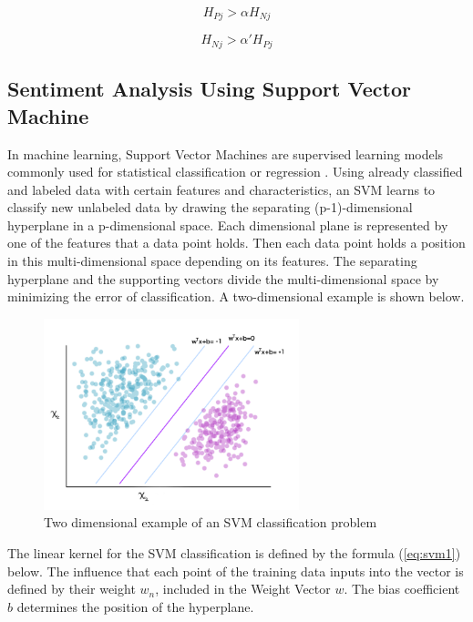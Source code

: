 \documentclass[review]{elsarticle}
\begin{document}
\begin{equation}\label{eq:entropy_pos}
H_{Pj} > \alpha H_{Nj}
\end{equation}

\begin{equation}\label{eq:entropy_neg}
H_{Nj} > \alpha' H_{Pj}
\end{equation}

\subsection{Sentiment Analysis Using Support Vector Machine}\label{svm}

In machine learning, Support Vector Machines are supervised learning models commonly used for statistical classification or regression \cite[][]{cortes1995}. Using already classified and labeled data with certain features and characteristics, an SVM learns to classify new unlabeled data by drawing the separating (p-1)-dimensional hyperplane in a p-dimensional space. Each dimensional plane is represented by one of the features that a data point holds. Then each data point holds a position in this multi-dimensional space depending on its features. The separating hyperplane and the supporting vectors divide the multi-dimensional space by minimizing the error of classification. A two-dimensional example is shown below.

\begin{figure}[h]
\centering
\includegraphics[width=20em]{SVM_2d_example.png}
\caption{Two dimensional example of an SVM classification problem}
\label{fig:svm2d}
\end{figure}

The linear kernel for the SVM classification is defined by the formula (\ref{eq:svm1}) below. The influence that each point of the training data inputs into the vector is defined by their weight \(w_{n}\), included in the Weight Vector \(w\). The bias coefficient \(b\) determines the position of the hyperplane.
\end{document}
